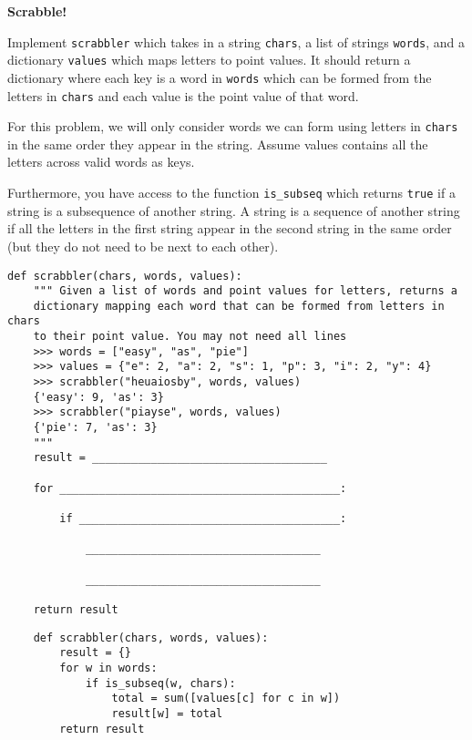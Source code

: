\begin{blocksection}
    \question \textbf{Scrabble!}  
    
    Implement \lstinline{scrabbler} which takes in a string \lstinline{chars}, a list of strings \lstinline{words}, and a dictionary \lstinline{values} which maps letters to point values. It should return a dictionary where each key is a word in \lstinline{words} which can be formed from the letters in \lstinline{chars} and each value is the point value of that word.

    For this problem, we will only consider words we can form using letters in \lstinline{chars} in the same order they appear in the string. Assume values contains all the letters across valid words as keys.

    Furthermore, you have access to the function \lstinline{is_subseq} which returns \lstinline{true} if a string is a subsequence of another string. A string is a sequence of another string if  all the letters in the first string appear in the second string in the same order (but they do not need to be next to each other).
    
    \begin{lstlisting}
def scrabbler(chars, words, values):
    """ Given a list of words and point values for letters, returns a
    dictionary mapping each word that can be formed from letters in chars
    to their point value. You may not need all lines
    >>> words = ["easy", "as", "pie"]
    >>> values = {"e": 2, "a": 2, "s": 1, "p": 3, "i": 2, "y": 4}
    >>> scrabbler("heuaiosby", words, values)
    {'easy': 9, 'as': 3}
    >>> scrabbler("piayse", words, values)
    {'pie': 7, 'as': 3}
    """
    result = ____________________________________

    for ___________________________________________:

        if ________________________________________:

            ____________________________________

            ____________________________________
    
    return result
    \end{lstlisting}
    \end{blocksection}
    
    \begin{blocksection}
    \begin{solution}
    \begin{lstlisting}
    def scrabbler(chars, words, values):
        result = {}
        for w in words:
            if is_subseq(w, chars):
                total = sum([values[c] for c in w])
                result[w] = total
        return result
    \end{lstlisting}
    \end{solution}
    \end{blocksection}
    
